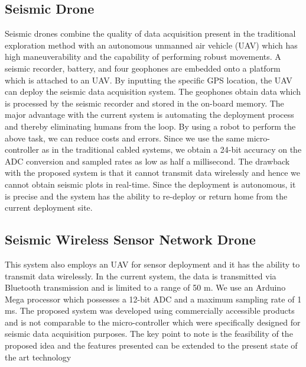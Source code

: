 \subsection{Seismic Drone}  

Seismic drones combine the quality of data acquisition present in the traditional exploration method with an autonomous unmanned air vehicle (UAV) which has high maneuverability and the capability of performing robust movements. A seismic recorder, battery, and four geophones are embedded onto a platform which is attached to an UAV. By inputting the specific GPS location, the UAV can deploy the seismic data acquisition system. The geophones obtain data which is processed by the seismic recorder and stored in the on-board memory. The major advantage with the current system is automating the deployment process and thereby eliminating humans from the loop. By using a robot to perform the above task, we can reduce costs and errors. Since we use the same micro-controller as in the traditional cabled systems, we obtain a 24-bit accuracy on the ADC conversion and sampled rates as low as half a millisecond. The drawback with the proposed system is that it cannot transmit data wirelessly and hence we cannot obtain seismic plots in real-time. Since the deployment is autonomous, it is precise and the system has the ability to re-deploy or return home from the current deployment site. 
 
\subsection{Seismic Wireless Sensor Network Drone}
   
   This system also employs an UAV for sensor deployment and it has the ability to transmit data wirelessly. In the current system, the data is transmitted via Bluetooth transmission and is limited to a range of 50 m. We use an Arduino Mega processor which possesses a 12-bit ADC and a maximum sampling rate of 1 ms. The proposed system was developed using commercially accessible products and is not comparable to the micro-controller which were specifically designed for seismic data acquisition purposes. The key point to note is the feasibility of the proposed idea and the features presented can be extended to the present state of the art technology
